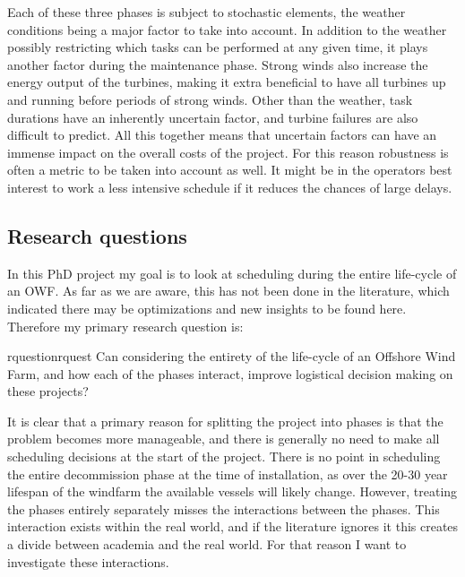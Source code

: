 \documentclass[a4paper,12pt]{article}
\begin{document}
Each of these three phases is subject to stochastic elements, the weather conditions being a major factor to take into account. In addition to the weather possibly restricting which tasks can be performed at any given time, it plays another factor during the maintenance phase. Strong winds also increase the energy output of the turbines, making it extra beneficial to have all turbines up and running before periods of strong winds. Other than the weather, task durations have an inherently uncertain factor, and turbine failures are also difficult to predict. All this together means that uncertain factors can have an immense impact on the overall costs of the project. For this reason robustness is often a metric to be taken into account as well. It might be in the operators best interest to work a less intensive schedule if it reduces the chances of large delays.

\subsection{Research questions}\label{ss:quest}
In this PhD project my goal is to look at scheduling during the entire life-cycle of an OWF. As far as we are aware, this has not been done in the literature, which indicated there may be optimizations and new insights to be found here. Therefore my primary research question is:

\begin{restatable}{rquestion}{rquest}
Can considering the entirety of the life-cycle of an Offshore Wind Farm, and how each of the phases interact, improve logistical decision making on these projects?
\label{rquest}
\end{restatable}

It is clear that a primary reason for splitting the project into phases is that the problem becomes more manageable, and there is generally no need to make all scheduling decisions at the start of the project. There is no point in scheduling the entire decommission phase at the time of installation, as over the 20-30 year lifespan of the windfarm the available vessels will likely change. However, treating the phases entirely separately misses the interactions between the phases. This interaction exists within the real world, and if the literature ignores it this creates a divide between academia and the real world. For that reason I want to investigate these interactions.

\bigskip
\end{document}
